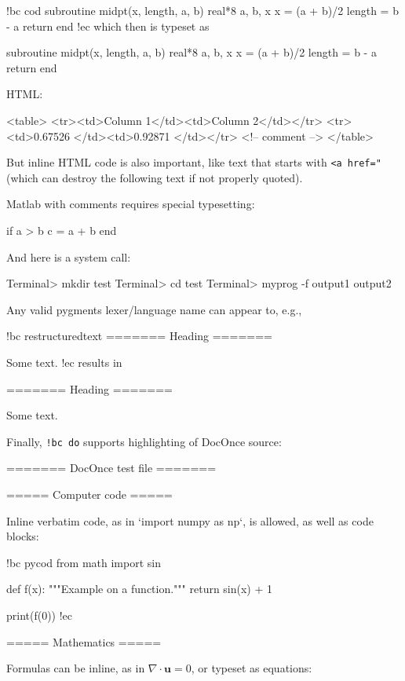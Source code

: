 \documentclass[%
oneside,                 %
final,                   %
10pt]{article}
\theoremstyle{definition}
\begin{document}
\bccq
!bc cod
      subroutine midpt(x, length, a, b)
      real*8 a, b, x
      x = (a + b)/2
      length = b - a
      return
      end
!ec
\eccq
which then is typeset as

\bcod
      subroutine midpt(x, length, a, b)
      real*8 a, b, x
      x = (a + b)/2
      length = b - a
      return
      end
\ecod

HTML:

\bhtmlcod
<table>
<tr><td>Column 1</td><td>Column 2</td></tr>
<tr><td>0.67526 </td><td>0.92871 </td></tr>
<!-- comment -->
</table>
\ehtmlcod

But inline HTML code is also important, like text that starts with
\texttt{<a href="} (which can destroy the following text if not properly
quoted).

Matlab with comments requires special typesetting:

\bmcod
if a > b
  c = a + b
end
\emcod

And here is a system call:

\bsys
Terminal> mkdir test
Terminal> cd test
Terminal> myprog -f
output1
output2
\esys

Any valid pygments lexer/language name can appear to, e.g.,

\bccq
!bc restructuredtext
=======
Heading
=======

Some text.
!ec
\eccq
results in

\brestructuredtext
=======
Heading
=======

Some text.
\erestructuredtext






Finally, \Verb?!bc do? supports highlighting of DocOnce source:

\bdo
======= DocOnce test file =======

===== Computer code =====

Inline verbatim code, as in `import numpy as np`, is allowed, as well as
code blocks:

!bc pycod
from math import sin

def f(x):
    """Example on a function."""
    return sin(x) + 1

print(f(0))
!ec


===== Mathematics =====

Formulas can be inline, as in $\nabla\cdot\bm{u} = 0$, or typeset
as equations:
\end{document}
